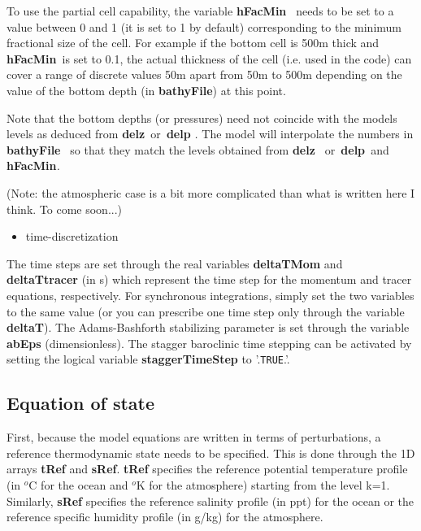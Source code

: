 To use the partial cell capability, the variable \textbf{hFacMin}\textit{\ }%
needs to be set to a value between 0 and 1 (it is set to 1 by default)
corresponding to the minimum fractional size of the cell. For example if the
bottom cell is 500m thick and \textbf{hFacMin}\textit{\ }is set to 0.1, the
actual thickness of the cell (i.e. used in the code) can cover a range of
discrete values 50m apart from 50m to 500m depending on the value of the
bottom depth (in \textbf{bathyFile}) at this point.

Note that the bottom depths (or pressures) need not coincide with the models
levels as deduced from \textbf{delz}\textit{\ }or\textit{\ }\textbf{delp}%
\textit{. }The model will interpolate the numbers in \textbf{bathyFile}%
\textit{\ }so that they match the levels obtained from \textbf{delz}\textit{%
\ }or\textit{\ }\textbf{delp}\textit{\ }and \textbf{hFacMin}\textit{. }

(Note: the atmospheric case is a bit more complicated than what is written
here I think. To come soon...)

\begin{itemize}
\item time-discretization
\end{itemize}

The time steps are set through the real variables \textbf{deltaTMom}
and \textbf{deltaTtracer} (in s) which represent the time step for the
momentum and tracer equations, respectively. For synchronous
integrations, simply set the two variables to the same value (or you
can prescribe one time step only through the variable
\textbf{deltaT}). The Adams-Bashforth stabilizing parameter is set
through the variable \textbf{abEps} (dimensionless). The stagger
baroclinic time stepping can be activated by setting the logical
variable \textbf{staggerTimeStep} to '.\texttt{TRUE}.'.

\subsection{Equation of state}

First, because the model equations are written in terms of
perturbations, a reference thermodynamic state needs to be specified.
This is done through the 1D arrays \textbf{tRef} and \textbf{sRef}.
\textbf{tRef} specifies the reference potential temperature profile
(in $^{o}$C for the ocean and $^{o}$K for the atmosphere) starting
from the level k=1. Similarly, \textbf{sRef} specifies the reference
salinity profile (in ppt) for the ocean or the reference specific
humidity profile (in g/kg) for the atmosphere.

